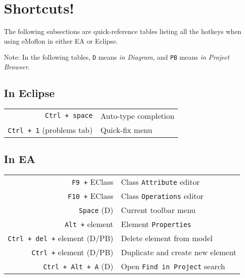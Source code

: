 \newpage
\section{Shortcuts!}
\genHeader

The following subsections are quick-reference tables listing all the hotkeys when using eMoflon in either EA or Eclipse. 

{\small Note: In the following tables,
\texttt{D} means \emph{in Diagram}, and \texttt{PB} means \emph{in Project Browser}. }

\subsection{In Eclipse}

\begin{tabular}{r|l}
\texttt{Ctrl + space} & Auto-type completion\\
\texttt{Ctrl + 1} (problems tab) & Quick-fix menu \\
%
\end{tabular}


\subsection{In EA}

\begin{tabular}{r|l}
\texttt{F9 +} EClass & Class \texttt{Attribute} editor \\
\texttt{F10 +} EClass & Class \texttt{Operations} editor \\
\texttt{Space} (D) & Current toolbar menu \\
\texttt{Alt +} element & Element \texttt{Properties} \\
\texttt{Ctrl + del +} element (D/PB) & Delete element from model\\
\texttt{Ctrl +} element (D/PB) & Duplicate and create new element \\
\texttt{Ctrl + Alt + A} (D) & Open \texttt{Find in Project} search \\
%
\end{tabular}
